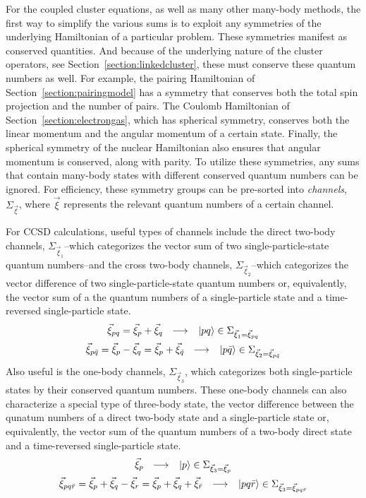 \documentclass[thesis.tex]{subfiles}
\begin{document}
For the coupled cluster equations, as well as many other many-body methods, the first way to simplify the various sums is to exploit any symmetries of the underlying Hamiltonian of a particular problem.  These symmetries manifest as conserved quantities.  And because of the underlying nature of the cluster operators, see Section\ \ref{section:linkedcluster}, these must conserve these quantum numbers as well.  For example, the pairing Hamiltonian of Section\ \ref{section:pairingmodel} has a symmetry that conserves both the total spin projection and the number of pairs.  The Coulomb Hamiltonian of Section\ \ref{section:electrongas}, which has spherical symmetry, conserves both the linear momentum and the angular momentum of a certain state.  Finally, the spherical symmetry of the nuclear Hamiltonian also ensures that angular momentum is conserved, along with parity.  To utilize these symmetries, any sums that contain many-body states with different conserved quantum numbers can be ignored.  For efficiency, these symmetry groups can be pre-sorted into \textit{channels}, $\Sigma_{\vec{\xi}}$, where $\vec{\xi}$ represents the relevant quantum numbers of a certain channel.

For CCSD calculations, useful types of channels include the direct two-body channels, $\Sigma_{\vec{\xi}_{1}}$--which categorizes the vector sum of two single-particle-state quantum numbers--and the cross two-body channels, $\Sigma_{\vec{\xi}_{2}}$--which categorizes the vector difference of two single-particle-state quantum numbers or, equivalently, the vector sum of a the quantum numbers of a single-particle state and a time-reversed single-particle state.
\begin{gather}
  \vec{\xi}_{pq} = \vec{\xi}_{p} + \vec{\xi}_{q}\ \ \longrightarrow\ \ \ket{pq} \in \Sigma_{\vec{\xi}_{1}=\vec{\xi}_{pq}} \\
  \vec{\xi}_{p\bar{q}} = \vec{\xi}_{p} - \vec{\xi}_{q} = \vec{\xi}_{p} + \vec{\xi}_{\bar{q}}\ \ \longrightarrow\ \ \ket{p\bar{q}} \in \Sigma_{\vec{\xi}_{2}=\vec{\xi}_{p\bar{q}}}
\end{gather}
Also useful is the one-body channels, $\Sigma_{\vec{\xi}_{3}}$, which categorizes both single-particle states by their conserved quantum numbers.  These one-body channels can also characterize a special type of three-body state, the vector difference between the qunatum numbers of a direct two-body state and a single-particle state or, equivalently, the vector sum of the quantum numbers of a two-body direct state and a time-reversed single-particle state.
\begin{gather}
  \vec{\xi}_{p}\ \ \longrightarrow\ \ \ket{p} \in \Sigma_{\vec{\xi}_{3}=\vec{\xi}_{p}} \\
  \vec{\xi}_{pq\bar{r}} = \vec{\xi}_{p} + \vec{\xi}_{q} - \vec{\xi}_{r} = \vec{\xi}_{p} + \vec{\xi}_{q} + \vec{\xi}_{\bar{r}}\ \ \longrightarrow\ \ \ket{pq\bar{r}} \in \Sigma_{\vec{\xi}_{3}=\vec{\xi}_{pq\bar{r}}}
\end{gather}
\end{document}

